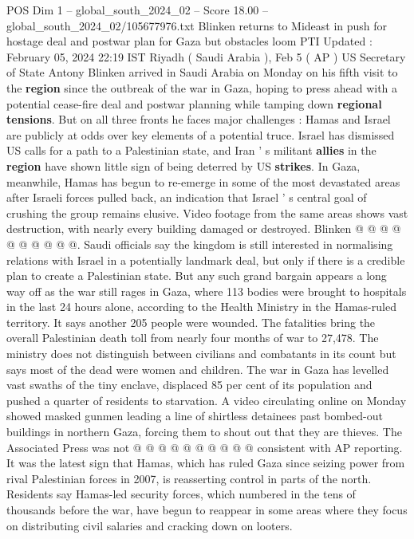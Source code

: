 \begin{textsample}{POS Dim 1 – global\_south\_2024\_02 – Score 18.00 – global\_south\_2024\_02/105677976.txt}  \label{ex:f1_pos_205}
Blinken returns to Mideast in push for hostage deal and postwar plan for Gaza but obstacles loom PTI Updated : February 05, 2024 22:19 IST Riyadh ( Saudi Arabia ), Feb 5 ( AP ) US Secretary of State Antony Blinken arrived in Saudi Arabia on Monday on his fifth visit to the \textbf{region} since the outbreak of the war in Gaza, hoping to press ahead with a potential cease-fire deal and postwar planning while tamping down \textbf{regional} \textbf{tensions}.
But on all three fronts he faces major challenges : Hamas and Israel are publicly at odds over key elements of a potential truce.
Israel has dismissed US calls for a path to a Palestinian state, and Iran ' s militant \textbf{allies} in the \textbf{region} have shown little sign of being deterred by US \textbf{strikes}.
In Gaza, meanwhile, Hamas has begun to re-emerge in some of the most devastated areas after Israeli forces pulled back, an indication that Israel ' s central goal of crushing the group remains elusive.
Video footage from the same areas shows vast destruction, with nearly every building damaged or destroyed.
Blinken @ @ @ @ @ @ @ @ @ @.
Saudi officials say the kingdom is still interested in normalising relations with Israel in a potentially landmark deal, but only if there is a credible plan to create a Palestinian state.
But any such grand bargain appears a long way off as the war still rages in Gaza, where 113 bodies were brought to hospitals in the last 24 hours alone, according to the Health Ministry in the Hamas-ruled territory.
It says another 205 people were wounded.
The fatalities bring the overall Palestinian death toll from nearly four months of war to 27,478.
The ministry does not distinguish between civilians and combatants in its count but says most of the dead were women and children.
The war in Gaza has levelled vast swaths of the tiny enclave, displaced 85 per cent of its population and pushed a quarter of residents to starvation.
A video circulating online on Monday showed masked gunmen leading a line of shirtless detainees past bombed-out buildings in northern Gaza, forcing them to shout out that they are thieves.
The Associated Press was not @ @ @ @ @ @ @ @ @ @ consistent with AP reporting.
It was the latest sign that Hamas, which has ruled Gaza since seizing power from rival Palestinian forces in 2007, is reasserting control in parts of the north.
Residents say Hamas-led security forces, which numbered in the tens of thousands before the war, have begun to reappear in some areas where they focus on distributing civil salaries and cracking down on looters.

\end{textsample}
